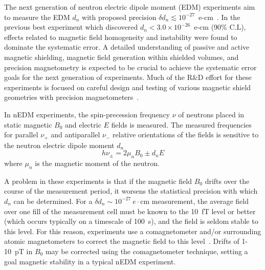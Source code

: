 \documentclass[review]{elsarticle}
\begin{document}
The next generation of neutron electric dipole moment (EDM)
experiments aim to measure the EDM $d_n$ with proposed precision
$\delta d_n\lesssim
10^{-27}$~e-cm~\cite{bib:nedm2,bib:nedm2.5,bib:nedm3,bib:nedm3.5,bib:nedm4,bib:nedm5,bib:nedm6,bib:nedm6.5}.
In the previous best experiment \cite{bib:baker,bib:pendlebury} which
discovered $d_n<3.0\times 10^{-26}$~e-cm (90\% C.L), effects related
to magnetic field homogeneity and instability were found to dominate
the systematic error.  A detailed understanding of passive and active
magnetic shielding, magnetic field generation within shielded volumes,
and precision magnetometry is expected to be crucial to achieve the
systematic error goals for the next generation of experiments.  Much
of the R\&D effort for these experiments is focused on careful design
and testing of various magnetic shield geometries with precision
magnetometers~\cite{bib:brys,bib:afach,bib:fierlingerroom,bib:sturmthesis,bib:patton}.


In nEDM experiments, the spin-precession frequency $\nu$ of neutrons
placed in static magnetic $B_0$ and electric $E$ fields is measured.
The measured frequencies for parallel $\nu_+$ and antiparallel $\nu_-$
relative orientations of the fields is sensitive to the neutron
electric dipole moment $d_n$
\begin{equation}
h\nu_\pm=2\mu_nB_0\pm d_nE
\end{equation}
where $\mu_n$ is the magnetic moment of the neutron.

A problem in these experiments is that if the magnetic field $B_0$
drifts over the course of the measurement period, it worsens the
statistical precision with which $d_n$ can be determined.  For a
$\delta d_n\sim 10^{-27}~e\cdot$cm measurement, the average field over
one fill of the measurement cell must be known to the 10~fT level or
better (which occurs typically on a timescale of 100~s), and the field
is seldom stable to this level.  For this reason, experiments use a
comagnetometer and/or surrounding atomic magnetometers to correct the
magnetic field to this level~\cite{bib:nedm4,bib:afach,bib:brys}.
Drifts of 1-10~pT in $B_0$ may be corrected using the comagnetometer
technique, setting a goal magnetic stability in a typical nEDM
experiment.
\end{document}
